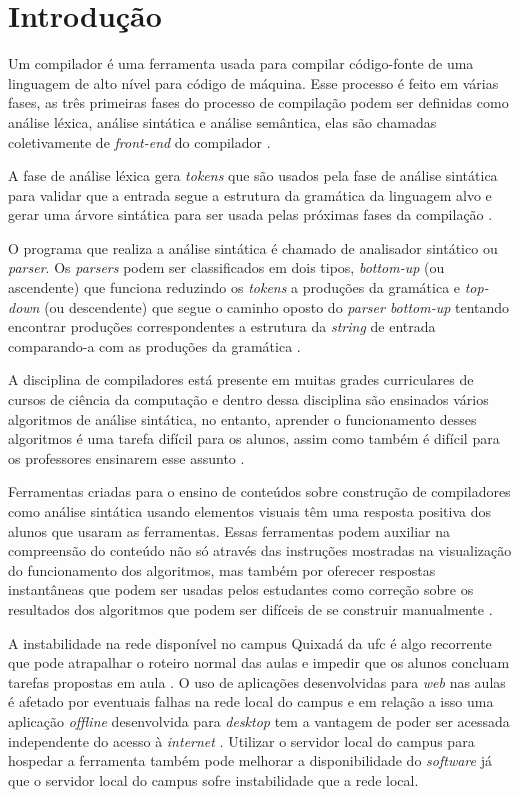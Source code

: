 \chapter{Introdução}
\label{cap:introducao}

Um compilador é uma ferramenta usada para compilar código-fonte de uma linguagem de alto nível para código de máquina. Esse processo é feito em várias fases, as três primeiras fases do processo de compilação podem ser definidas como análise léxica, análise sintática e análise semântica, elas são chamadas coletivamente de \textit{front-end} do compilador \cite{mogensen2024introduction}.

A fase de análise léxica gera \textit{tokens} que são usados pela fase de análise sintática para validar que a entrada segue a estrutura da gramática da linguagem alvo e gerar uma árvore sintática para ser usada pelas próximas fases da compilação \cite{thain2020introduction}.

O programa que realiza a análise sintática é chamado de analisador sintático ou \textit{parser}. Os \textit{parsers} podem ser classificados em dois tipos, \textit{bottom-up} (ou ascendente) que funciona reduzindo os \textit{tokens} a produções da gramática e \textit{top-down} (ou descendente) que segue o caminho oposto do \textit{parser bottom-up} tentando encontrar produções correspondentes a estrutura da \textit{string} de entrada comparando-a com as produções da gramática \cite{cooper2022engineering}.

A disciplina de compiladores está presente em muitas grades curriculares de cursos de ciência da computação e dentro dessa disciplina são ensinados vários algoritmos de análise sintática, no entanto, aprender o funcionamento desses algoritmos é uma tarefa difícil para os alunos, assim como também é difícil para os professores ensinarem esse assunto \cite{sangal2018pavt}.

Ferramentas criadas para o ensino de conteúdos sobre construção de compiladores como análise sintática usando elementos visuais têm uma resposta positiva dos alunos que usaram as ferramentas. Essas ferramentas podem auxiliar na compreensão do conteúdo não só através das instruções mostradas na visualização do funcionamento dos algoritmos, mas também por oferecer respostas instantâneas que podem ser usadas pelos estudantes como correção sobre os resultados dos algoritmos que podem ser difíceis de se construir manualmente \cite{10.1145/3002136}.

A instabilidade na rede disponível no campus Quixadá da \gls{ufc} é algo recorrente que pode atrapalhar o roteiro normal das aulas e impedir que os alunos concluam tarefas propostas em aula \cite{perez2023impact}. O uso de aplicações desenvolvidas para \textit{web} nas aulas é afetado por eventuais falhas na rede local do campus e em relação a isso uma aplicação \textit{offline} desenvolvida para \textit{desktop} tem a vantagem de poder ser acessada independente do acesso à \textit{internet} \cite{holzer2012mobile}. Utilizar o servidor local do campus para hospedar a ferramenta também pode melhorar a disponibilidade do \textit{software} já que o servidor local do campus sofre instabilidade que a rede local.

